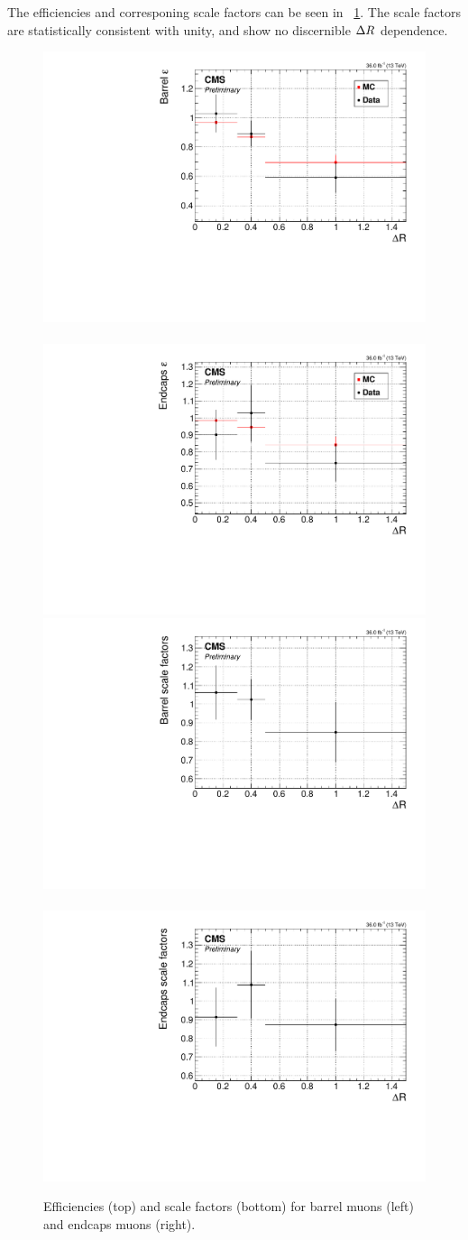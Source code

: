 The efficiencies and corresponing scale factors can be seen in ~\ref{fig:tb-eff-sf}. The scale factors are statistically consistent with unity, and show no discernible $\Delta R$ dependence.

\begin{figure}[!htbp]
\centering
\includegraphics[width=0.48\linewidth]{plots/scale_factors/barrelDeltaRSingleElectron.pdf} \,
\includegraphics[width=0.48\linewidth]{plots/scale_factors/endcapsDeltaRSingleElectron.pdf}  \\
\includegraphics[width=0.48\linewidth]{plots/scale_factors/barrelDeltaRisoScaleFactorsSingleElectron.pdf} \,
\includegraphics[width=0.48\linewidth]{plots/scale_factors/endcapsDeltaRisoScaleFactorsSingleElectron.pdf} \\
\caption[Efficiencies and scale factors]{Efficiencies (top) and scale factors (bottom) for barrel muons (left) and endcaps muons (right).}
\label{fig:tb-eff-sf}
\end{figure}